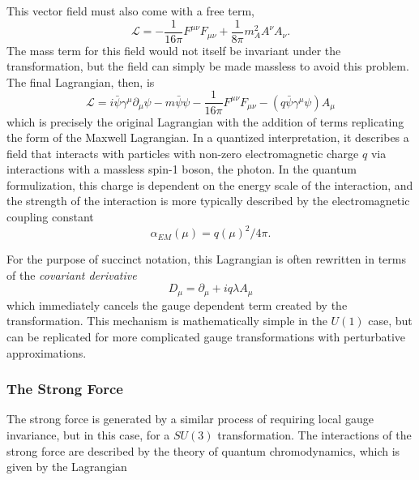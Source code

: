 This vector field must also come with a free term, 
\begin{equation}
\mathcal{L} = -\frac{1}{16\pi}F^{\mu\nu}F_{\mu\nu} + \frac{1}{8\pi}m_A^2A^\nu A_\nu . 
\end{equation}
The mass term for this field would not itself be invariant under the transformation, but the field can simply be made massless to avoid this problem. The final Lagrangian, then, is 
\begin{equation}
\mathcal{L} = i\bar{\psi}\gamma^\mu \partial_\mu\psi - m \bar{\psi}\psi -\frac{1}{16\pi}F^{\mu\nu}F_{\mu\nu} - (q\bar{\psi}\gamma^\mu\psi)A_\mu
\label{eq:l_em}
\end{equation}
which is precisely the original Lagrangian with the addition of terms replicating the form of the Maxwell Lagrangian. In a quantized interpretation, it describes a field that interacts with particles with non-zero electromagnetic charge $q$ via interactions with a massless spin-1 boson, the photon. In the quantum formulization, this charge is dependent on the energy scale of the interaction, and the strength of the interaction is more typically described by the electromagnetic coupling constant
\begin{equation}
\alpha_{EM}(\mu) =  q(\mu)^2 / 4\pi . 
\end{equation}

For the purpose of succinct notation, this Lagrangian is often rewritten in terms of the \textit{covariant derivative}
\begin{equation}
D_\mu = \partial_\mu + iq\lambda A_\mu
\end{equation}
which immediately cancels the gauge dependent term created by the transformation. This mechanism is mathematically simple in the $U(1)$ case, but can be replicated for more complicated gauge transformations with perturbative approximations. 


\subsubsection{The Strong Force}
\label{sec:strong}

The strong force is generated by a similar process of requiring local gauge invariance, but in this case, for a $SU(3)$ transformation. The interactions of the strong force are described by the theory of quantum chromodynamics, which is given by the Lagrangian

